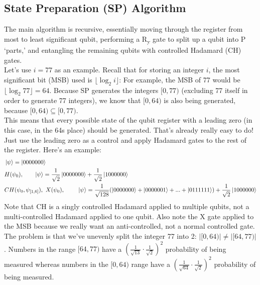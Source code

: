 \documentclass[12pt]{article}
\begin{document}
\subsection{State Preparation (SP) Algorithm}
The main algorithm is recursive, essentially moving through the register from most to least significant qubit, performing a R\textsubscript{y} gate to split up a qubit into P `parts,' and entangling the remaining qubits with controlled Hadamard (CH) gates. \\
\indent Let's use $i = 77$ as an example. Recall that for storing an integer $i$, the most significant bit (MSB) used is $\lfloor \log_2 i \rfloor$: For example, the MSB of 77 would be $\lfloor \log_2 77 \rfloor = 64$. Because SP generates the integers $[0, 77)$ (excluding 77 itself in order to generate 77 integers), we know that $[0, 64)$ is also being generated, because $[0, 64) \subseteq [0, 77)$. \\
\indent This means that every possible state of the qubit register with a leading zero (in this case, in the 64s place) should be generated. That's already really easy to do! Just use the leading zero as a control and apply Hadamard gates to the rest of the register. Here's an example:
\begin{align*}
& \ket{\psi} = \ket{0000000} \\
& H(\psi_0), \ \ \ \ \ \ \ket{\psi} = \frac{1}{\sqrt{2}} \ket{0000000} + \frac{1}{\sqrt{2}} \ket{1000000} \\
& CH(\psi_0, \psi_{[1, 6]}), \ X(\psi_0), \ \ \ \ \ \ \ \ket{\psi} = \frac{1}{\sqrt{128}}(\ket{0000000} + \ket{0000001} + ... + \ket{0111111}) + \frac{1}{\sqrt{2}} \ket{1000000}
\end{align*}
Note that CH is a singly controlled Hadamard applied to multiple qubits, not a multi-controlled Hadamard applied to one qubit. Also note the X gate applied to the MSB because we really want an anti-controlled, not a normal controlled gate. The problem is that we've unevenly split the integer 77 into 2: $|[0, 64)| \neq |[64, 77)|$. Numbers in the range $[64, 77)$ have a $\left(\frac{1}{\sqrt{13}} \cdot \frac{1}{\sqrt{2}}\right)^2$ probability of being measured whereas numbers in the $[0, 64)$ range have a $\left(\frac{1}{\sqrt{64}} \cdot \frac{1}{\sqrt{2}}\right)^2$ probability of being measured. \\
\end{document}
